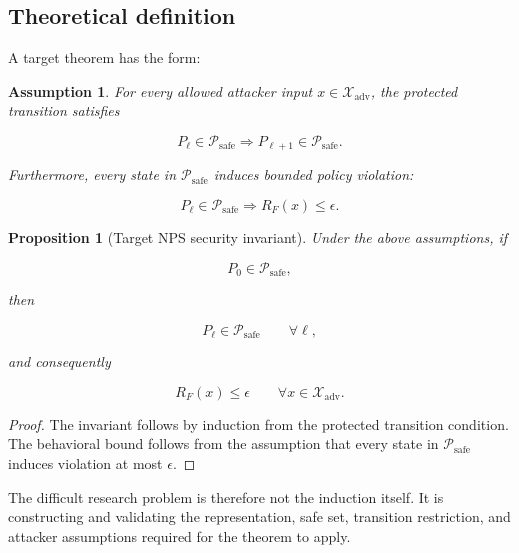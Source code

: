 \documentclass[11pt]{article}
\newcommand{\X}{\mathcal{X}}
\newcommand{\Psafe}{\mathcal{P}_{\mathrm{safe}}}
\newtheorem{proposition}{Proposition}
\newtheorem{assumption}{Assumption}
\begin{document}
\subsection*{Theoretical definition}

A target theorem has the form:

\begin{assumption}
For every allowed attacker input $x\in\X_{\mathrm{adv}}$, the protected
transition satisfies

\begin{equation}
P_\ell\in\Psafe
\Longrightarrow
P_{\ell+1}\in\Psafe.
\end{equation}

Furthermore, every state in $\Psafe$ induces bounded policy violation:

\begin{equation}
P_\ell\in\Psafe
\Longrightarrow
R_F(x)\leq\epsilon.
\end{equation}
\end{assumption}

\begin{proposition}[Target NPS security invariant]
Under the above assumptions, if

\begin{equation}
P_0\in\Psafe,
\end{equation}

then

\begin{equation}
P_\ell\in\Psafe
\qquad
\forall\ell,
\end{equation}

and consequently

\begin{equation}
R_F(x)\leq\epsilon
\qquad
\forall x\in\X_{\mathrm{adv}}.
\end{equation}
\end{proposition}

\begin{proof}
The invariant follows by induction from the protected transition condition.
The behavioral bound follows from the assumption that every state in
$\Psafe$ induces violation at most $\epsilon$.
\end{proof}

The difficult research problem is therefore not the induction itself. It is
constructing and validating the representation, safe set, transition
restriction, and attacker assumptions required for the theorem to apply.

\end{document}

